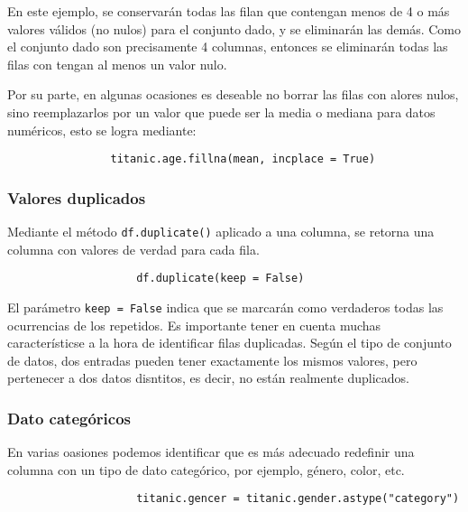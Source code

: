             En este ejemplo, se conservarán todas las filan que contengan menos de 4 o más valores válidos (no nulos) para el conjunto dado, y se eliminarán las demás. Como el conjunto dado son precisamente 4 columnas, entonces se eliminarán todas las filas con tengan al menos un valor nulo. 

            Por su parte, en algunas ocasiones es deseable no borrar las filas con alores nulos, sino reemplazarlos por un valor que puede ser la media o mediana para datos numéricos, esto se logra mediante:

            \begin{verbatim}
                titanic.age.fillna(mean, incplace = True)
            \end{verbatim}

            \subsubsection{Valores duplicados}

                Mediante el método \texttt{df.duplicate()} aplicado a una columna, se retorna una columna con valores de verdad para cada fila. 

                \begin{verbatim}
                    df.duplicate(keep = False)
                \end{verbatim}
                
                El parámetro \texttt{keep = False} indica que se marcarán como verdaderos todas las ocurrencias de los repetidos. Es importante tener en cuenta muchas característicse a la hora de identificar filas duplicadas. Según el tipo de conjunto de datos, dos entradas pueden tener exactamente los mismos valores, pero pertenecer a dos datos disntitos, es decir, no están realmente duplicados. 

            \subsubsection{Dato categóricos}

                En varias oasiones podemos identificar que es más adecuado redefinir una columna con un tipo de dato categórico, por ejemplo, género, color, etc.

                \begin{verbatim}
                    titanic.gencer = titanic.gender.astype("category")
                \end{verbatim}

